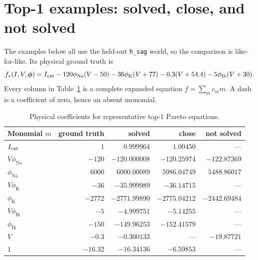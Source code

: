 \documentclass[10pt]{article}
\newcommand{\code}[1]{\nolinkurl{#1}}
\newcommand{\phina}{\phi_{\mathrm{Na}}}
\newcommand{\phik}{\phi_{\mathrm{K}}}
\newcommand{\phiih}{\phi_{\mathrm{Ih}}}
\begin{document}
\section*{Top-1 examples: solved, close, and not solved}

The examples below all use the held-out \code{h_sag} world, so the comparison is like-for-like.
Its physical ground truth is
\[
 f_*(I,V,\boldsymbol\phi)=I_{\rm ext}
 -120\phina(V-50)-36\phik(V+77)-0.3(V+54.4)-5\phiih(V+30).
\]
Every column in Table~\ref{tab:coefficients} is a complete expanded equation
$f=\sum_m c_m m$. A dash is a coefficient of zero, hence an absent monomial.

\begin{table}[ht]
\centering
\small
\caption{Physical coefficients for representative top-1 Pareto equations.}
\label{tab:coefficients}
\begin{tabular}{@{}lrrrr@{}}
\toprule
Monomial $m$ & ground truth & solved & close & not solved \\
\midrule
$I_{\rm ext}$       & $1$       & $0.999964$ & $1.00450$ & --- \\
$V\phina$            & $-120$    & $-120.000008$ & $-120.25974$ & $-122.87369$ \\
$\phina$             & $6000$    & $6000.00089$ & $5986.04749$ & $5488.86017$ \\
$V\phik$             & $-36$     & $-35.999989$ & $-36.14715$ & --- \\
$\phik$              & $-2772$   & $-2771.99890$ & $-2775.04212$ & $-2442.69484$ \\
$V\phiih$            & $-5$      & $-4.999751$ & $-5.14255$ & --- \\
$\phiih$             & $-150$    & $-149.96253$ & $-152.41579$ & --- \\
$V$                   & $-0.3$    & $-0.300133$ & --- & $-19.87721$ \\
$1$                   & $-16.32$  & $-16.34136$ & $-6.59853$ & --- \\
\bottomrule
\end{tabular}
\end{table}
\end{document}
